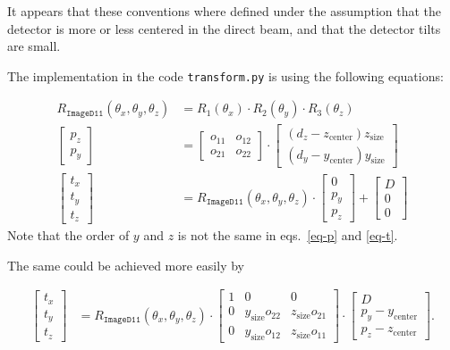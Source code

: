 \documentclass[12pt]{article}
\begin{document}
It appears that these conventions where defined under the assumption
that the detector is more or less centered in the direct beam, and
that the detector tilts are small.

The implementation in the code \texttt{transform.py} is using the
following equations:

\begin{align}
  R_{\mathtt{ImageD11}}(\theta_x, \theta_y, \theta_z)
  & =
  R_1(\theta_x) \cdot R_2(\theta_y) \cdot R_3(\theta_z)
  \\
  \begin{bmatrix}
    p_z \\ p_y
  \end{bmatrix}
  & =
  \begin{bmatrix}
    o_{11} & o_{12}
    \\ o_{21} & o_{22}
  \end{bmatrix}
  \cdot
  \begin{bmatrix}
    (d_z - z_{\mathrm{center}}) z_{\mathrm{size}} \\
    (d_y - y_{\mathrm{center}}) y_{\mathrm{size}}
  \end{bmatrix}
  \label{eq-p}
  \\
  \begin{bmatrix}
    t_x \\ t_y \\ t_z
  \end{bmatrix}
  & =
  R_{\mathtt{ImageD11}}(\theta_x, \theta_y, \theta_z)
  \cdot
  \begin{bmatrix}
    0 \\ p_y \\ p_z
  \end{bmatrix}
  +
  \begin{bmatrix}
    D \\ 0 \\ 0
  \end{bmatrix}
  \label{eq-t}
\end{align}
Note that the order of $y$ and $z$ is not the same in eqs.~\ref{eq-p} and \ref{eq-t}.

The same could be achieved more easily by

\begin{align}
  \begin{bmatrix}
    t_x \\ t_y \\ t_z
  \end{bmatrix}
  & =
  R_{\mathtt{ImageD11}}(\theta_x, \theta_y, \theta_z)
  \cdot
  \begin{bmatrix}
    1 & 0 & 0 \\
    0 & y_{\mathrm{size}} o_{22} & z_{\mathrm{size}} o_{21} \\
    0 & y_{\mathrm{size}} o_{12} & z_{\mathrm{size}} o_{11}
  \end{bmatrix}
  \cdot
  \begin{bmatrix}
    D \\ p_y - y_{\mathrm{center}} \\ p_z - z_{\mathrm{center}}
  \end{bmatrix}.
  \label{eq-tImageD11}
\end{align}
\end{document}
